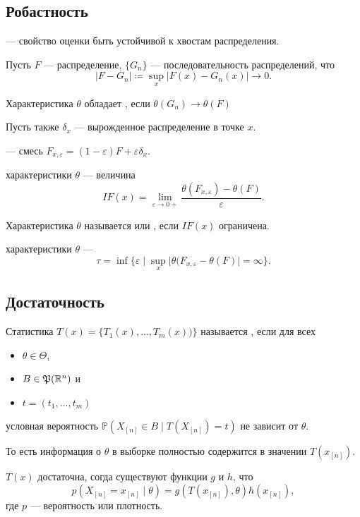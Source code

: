 \documentclass[11pt]{book}
\begin{document}
\subsection{Робастность}
\begin{definition}[]
	 --- свойство оценки быть устойчивой к хвостам распределения.
\end{definition}
	Пусть $F$ --- распределение,  $\{G_{n}\}$ --- последовательность распределений, что
	\[
	\lvert F - G_{n}\rvert \coloneqq \underset{x}{\sup} \lvert F(x) - G_n(x) \rvert \to 0
	.\] 
\begin{definition}[]
	Характеристика $\theta$ обладает , если $\theta(G_{n}) \to \theta(F)$
\end{definition}
Пусть также $\delta_x$ --- вырожденное распределение в точке $x$.
\begin{definition}[]
	 --- смесь $F_{x, \varepsilon} = (1-\varepsilon) F + \varepsilon \delta_x$.	
\end{definition}
\begin{definition}[]
	 характеристики $\theta$ --- величина $$IF(x) = \lim_{\varepsilon \to 0+} \frac{\theta(F_{x, \varepsilon}) - \theta(F)}{\varepsilon}.$$
\end{definition}
\begin{definition}[]
	Характеристика $\theta$ называется  или , если $IF(x)$ ограничена.
\end{definition}
\begin{definition}[]
	 характеристики $\theta$ ---
	\[
	\tau = \inf \bigl\{ \varepsilon \mid \underset{x}{\sup}\lvert \theta(F_{x, \varepsilon} - \theta(F) \rvert = \infty \bigr\}	
	.\] 
\end{definition}

\subsection{Достаточность}
\begin{definition}[]
	Статистика $T(x) = \{T_1(x), \ldots , T_m(x))\}$ называется , если для всех 
	\begin{itemize}[noitemsep]
		\item $\theta \in \Theta$,
		\item $B \in \mathfrak{P}(\mathbb{R}^{n})$ и 
		\item $t = (t_1, \ldots , t_m)$
	\end{itemize}
	 условная вероятность $\mathbb{P}(X_{[n]} \in B \mid T(X_{[n]}) = t)$ не зависит от $\theta$.

	 То есть информация о $\theta$ в выборке полностью содержится в значении $T(x_{[n]})$.
\end{definition}
\begin{theorem}[факторизации]
	$T(x)$ достаточна, согда существуют функции $g$ и  $h$, что
	\[
	p(X_{[n]} = x_{[n]} \mid \theta) = g(T(x_{[n]}), \theta) h(x_{[n]})
	,\] 
	где $p$ --- вероятность или плотность.
\end{theorem}
\end{document}
